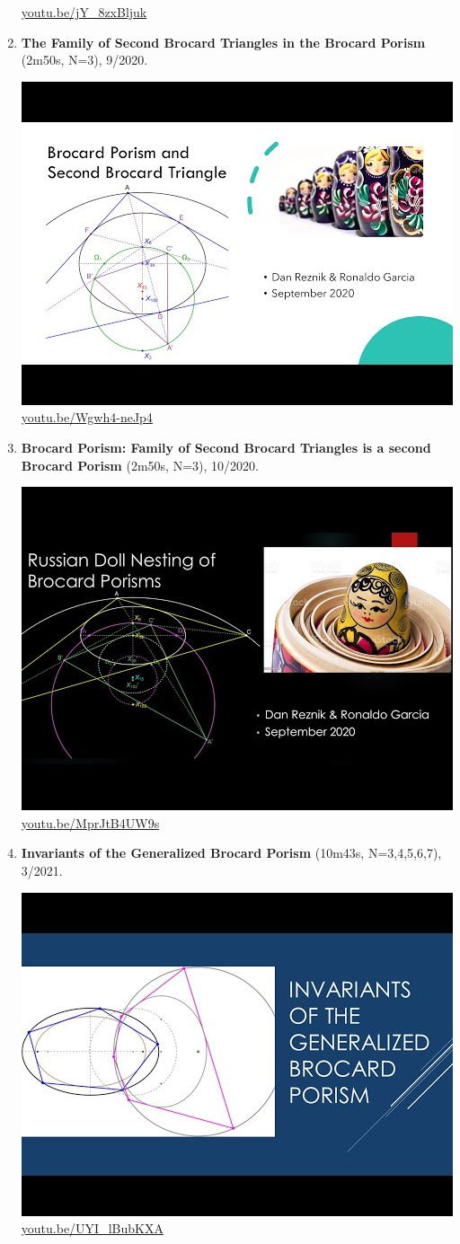 \documentclass[12pt]{amsart}
\begin{document}
\begin{enumerate}[resume]
\begin{center}
\href{https://youtu.be/jY_8zxBljuk}{\url{youtu.be/jY\_8zxBljuk}}\end{center}
% 
\item \textbf{The Family of Second Brocard Triangles in the Brocard Porism} (2m50s, N=3), 9/2020. 
\begin{center}\includegraphics[width=.5\textwidth]{pics/Wgwh4-neJp4.jpg} \\ 
\href{https://youtu.be/Wgwh4-neJp4}{\url{youtu.be/Wgwh4-neJp4}}\end{center}
% 
\item \textbf{Brocard Porism: Family of Second Brocard Triangles is a second Brocard Porism} (2m50s, N=3), 10/2020. 
\begin{center}\includegraphics[width=.5\textwidth]{pics/MprJtB4UW9s.jpg} \\ 
\href{https://youtu.be/MprJtB4UW9s}{\url{youtu.be/MprJtB4UW9s}}\end{center}
% 
\item \textbf{Invariants of the Generalized Brocard Porism} (10m43s, N=3,4,5,6,7), 3/2021. 
\begin{center}\includegraphics[width=.5\textwidth]{pics/UYI_lBubKXA.jpg} \\ 
\href{https://youtu.be/UYI_lBubKXA}{\url{youtu.be/UYI\_lBubKXA}}\end{center}
% 
\end{enumerate}
\end{document}
